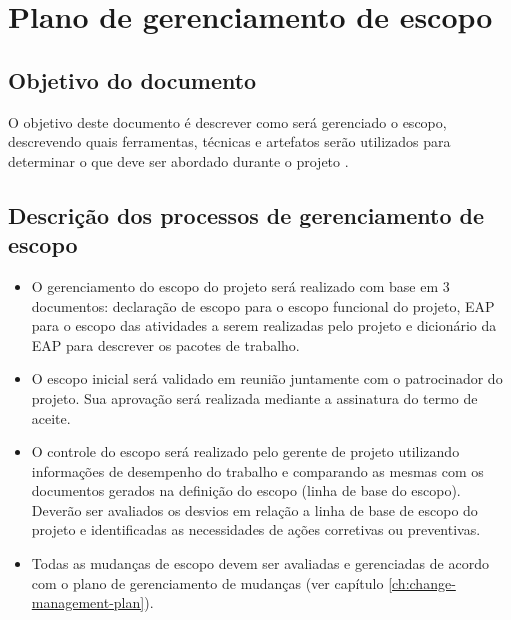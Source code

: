 

\chapter{Plano de gerenciamento de escopo}

\section{Objetivo do documento}

O objetivo deste documento é descrever como será gerenciado o escopo, descrevendo quais ferramentas, técnicas e artefatos serão utilizados para determinar o que deve ser abordado durante o projeto \projectName.

\section{Descrição dos processos de gerenciamento de escopo}

\begin{itemize}
	\item O gerenciamento do escopo do projeto será realizado com base em 3 documentos: declaração de escopo para o escopo funcional do projeto, EAP para o escopo das atividades a serem realizadas pelo projeto e dicionário da EAP para descrever os pacotes de trabalho.
	\item O escopo inicial será validado em reunião juntamente com o patrocinador do projeto. Sua aprovação será realizada mediante a assinatura do termo de aceite.
	\item O controle do escopo será realizado pelo gerente de projeto utilizando informações de desempenho do trabalho e comparando as mesmas com os documentos gerados na definição do escopo (linha de base do escopo). Deverão ser avaliados os desvios em relação a linha de base de escopo do projeto e identificadas as necessidades de ações corretivas ou preventivas.
	\item Todas as mudanças de escopo devem ser avaliadas e gerenciadas de acordo com o plano de gerenciamento de mudanças (ver capítulo \ref{ch:change-management-plan}).
\end{itemize}

